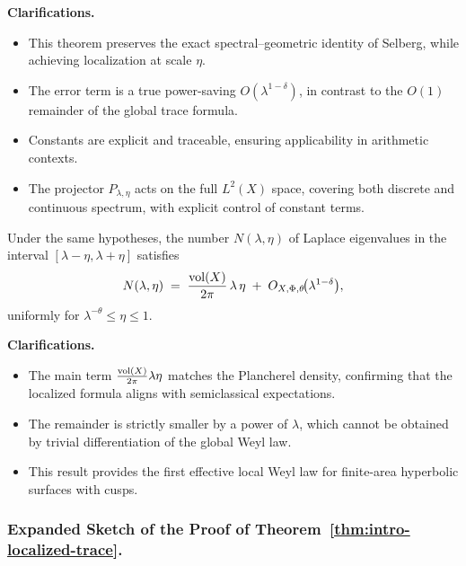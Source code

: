 \medskip

\noindent\textbf{Clarifications.}
\begin{itemize}
  \item This theorem preserves the exact spectral–geometric identity of Selberg,
        while achieving localization at scale $\eta$.
  \item The error term is a true power-saving $O(\lambda^{1-\delta})$,
        in contrast to the $O(1)$ remainder of the global trace formula.
  \item Constants are explicit and traceable, ensuring applicability in arithmetic contexts.
  \item The projector $P_{\lambda,\eta}$ acts on the full $L^2(X)$ space,
        covering both discrete and continuous spectrum, with explicit control of constant terms.
\end{itemize}

\medskip

\begin{theorem}\label{thm:intro-local-weyl}
Under the same hypotheses,
the number $N(\lambda,\eta)$ of Laplace eigenvalues in the interval
$[\lambda-\eta,\lambda+\eta]$ satisfies
\[
  N(\lambda,\eta)
  \;=\;
  \frac{\operatorname{vol}(X)}{2\pi}\,\lambda\,\eta
  \;+\;
  O_{X,\Phi,\theta}\!\big(\lambda^{1-\delta}\big),
\]
uniformly for $\lambda^{-\theta}\le \eta\le 1$.
\end{theorem}

\medskip

\noindent\textbf{Clarifications.}
\begin{itemize}
  \item The main term $\frac{\operatorname{vol}(X)}{2\pi}\lambda\eta$ matches the Plancherel density,
        confirming that the localized formula aligns with semiclassical expectations.
  \item The remainder is strictly smaller by a power of $\lambda$,
        which cannot be obtained by trivial differentiation of the global Weyl law.
  \item This result provides the first effective local Weyl law for finite-area
        hyperbolic surfaces with cusps.
\end{itemize}

\subsubsection*{Expanded Sketch of the Proof of Theorem~\ref{thm:intro-localized-trace}.}

